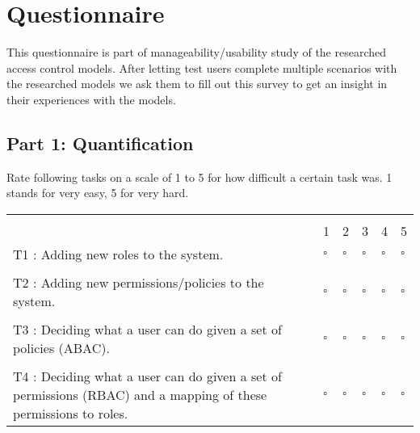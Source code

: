 \chapter{Questionnaire}
\label{chapt:appendix}

This questionnaire is part of manageability/usability study of the researched access control models. 
After letting test users complete multiple scenarios with the researched models we ask them to fill out this survey to get an insight in their experiences with the models.

\hskip-2.5cm\section{Part 1: Quantification}
Rate following tasks on a scale of 1 to 5 for how difficult a certain task  was.
1 stands for very easy, 5 for very hard.

\hskip-2.8cm\begin{tabular}{p{8cm} p{1cm} p{1cm} p{1cm} p{1cm} p{1cm}}
    \multicolumn{6}{c}{} \\
    & 1 & 2 & 3 & 4 & 5
    \\
    T1 : Adding new roles to the system.
    & $\square$ & $\square$ & $\square$ & $\square$ & $\square$ \\
    \\
    T2 : Adding new permissions/policies to the system.
    & $\square$ & $\square$ & $\square$ & $\square$ & $\square$ \\
    \\
    T3 : Deciding what a user can do given a set of policies (ABAC).
    & $\square$ & $\square$ & $\square$ & $\square$ & $\square$ \\
    \\
    T4 : Deciding what a user can do given a set of permissions (RBAC) and a mapping of these permissions to roles.
    & $\square$ & $\square$ & $\square$ & $\square$ & $\square$ \\
\end{tabular}
    
